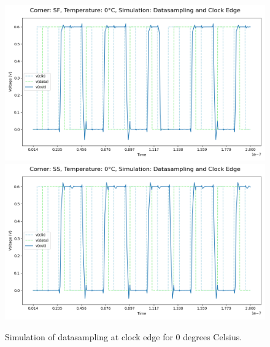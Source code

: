 \begin{figure}[H]
    \vspace{5pt}
    \includegraphics[height= 0.21\textheight]{figures/aimspice/SF/0/W1.csv.png}
    \vspace{5pt}
    \includegraphics[height= 0.21\textheight]{figures/aimspice/SS/0/W1.csv.png}
    \caption{Simulation of datasampling at clock edge for 0 degrees Celsius.}
    \label{fig:aimspice_W1_0}
\end{figure}

\pagebreak

